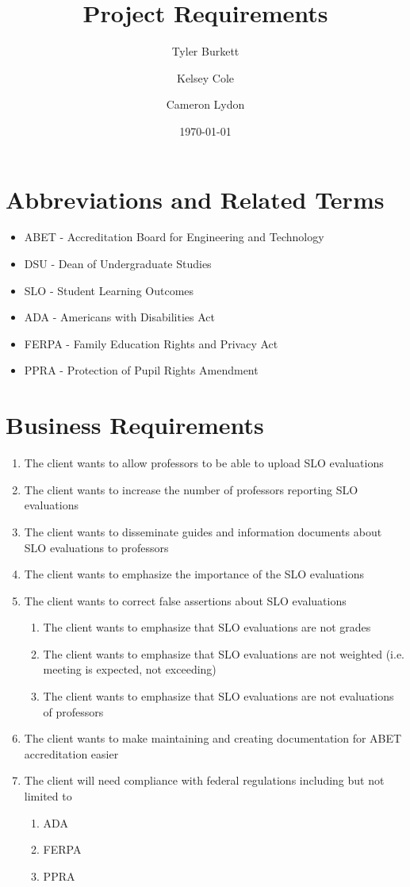 \documentclass[a4paper,12pt]{article}
\begin{document}
\title{Project Requirements}
\author{ Tyler Burkett \\
	\and
	Kelsey Cole
	\and
	Cameron Lydon
	}
\date{\today}
\maketitle

\section*{Abbreviations and Related Terms}
\begin{itemize}
\item ABET - Accreditation Board for Engineering and Technology
\item DSU - Dean of Undergraduate Studies
\item SLO - Student Learning Outcomes
\item ADA - Americans with Disabilities Act
\item FERPA - Family Education Rights and Privacy Act 
\item PPRA - Protection of Pupil Rights Amendment
\end{itemize}

\section*{Business Requirements}
\begin{enumerate}
\item The client wants to allow professors to be able to upload SLO evaluations
\item The client wants to increase the number of professors reporting SLO evaluations
\item The client wants to disseminate guides and information documents about SLO evaluations to professors
\item The client wants to emphasize the importance of the SLO evaluations
\item\label{item:b5} The client wants to correct false assertions about SLO evaluations 
	\begin{enumerate}
	\item The client wants to emphasize that SLO evaluations are not grades
	\item The client wants to emphasize that SLO evaluations are not weighted (i.e. meeting is expected, not exceeding)
	\item The client wants to emphasize that SLO evaluations are not evaluations of professors
	\end{enumerate}
\item The client wants to make maintaining and creating documentation for ABET accreditation easier
\item The client will need compliance with federal regulations including but not limited to
	\begin{enumerate}
	\item ADA
	\item FERPA
	\item PPRA
	\end{enumerate}
\end{enumerate}
\end{document}

